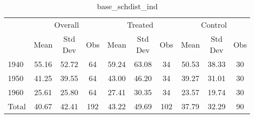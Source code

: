 \begin{table}[htbp]\centering
\def\sym#1{\ifmmode^{#1}\else\(^{#1}\)\fi}
\caption{base\_schdist\_ind \label{tab1}}
\begin{tabular}{l*{3}{ccc}}
\toprule
                    &\multicolumn{3}{c}{Overall}           &\multicolumn{3}{c}{Treated}           &\multicolumn{3}{c}{Control}           \\
                    &        Mean&     Std Dev&         Obs&        Mean&     Std Dev&         Obs&        Mean&     Std Dev&         Obs\\
\midrule
1940                &       55.16&       52.72&          64&       59.24&       63.08&          34&       50.53&       38.33&          30\\
1950                &       41.25&       39.55&          64&       43.00&       46.20&          34&       39.27&       31.01&          30\\
1960                &       25.61&       25.80&          64&       27.41&       30.35&          34&       23.57&       19.74&          30\\
Total               &       40.67&       42.41&         192&       43.22&       49.69&         102&       37.79&       32.29&          90\\
\bottomrule
\end{tabular}
\end{table}
